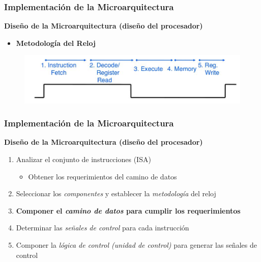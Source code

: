 \documentclass[aspectratio=169,compress]{beamer}
\begin{document}
\begin{footnotesize}
\begin{frame}
\end{frame}


\begin{frame}
\frametitle{Implementación de la Microarquitectura}
\begin{center}\textbf{Diseño de la Microarquitectura (diseño del procesador)}\end{center}
\begin{itemize}
\item \textbf{Metodología del Reloj}
\end{itemize}

\begin{figure}
\includegraphics[scale=0.3]{images/reloj-uniciclo.jpg} 
\end{figure}

\end{frame}



\begin{frame}
\frametitle{Implementación de la Microarquitectura}
\begin{center}\textbf{Diseño de la Microarquitectura (diseño del procesador)}\end{center}
\begin{enumerate}
\item Analizar el conjunto de instrucciones (ISA)
\begin{itemize}
\item Obtener los requerimientos del camino de datos
\end{itemize}
\item Seleccionar los \textit{componentes} y establecer la \textit{metodología} del reloj
\item \textbf{Componer el \textit{camino de datos} para cumplir los requerimientos}
\item Determinar las \textit{señales de control} para cada instrucción
\item Componer la \textit{lógica de control (unidad de control)} para generar las señales de control
\end{enumerate}
\end{frame}






\end{footnotesize}
\end{document}
